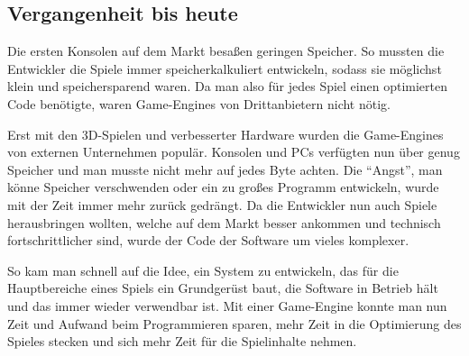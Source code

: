 \subsection{Vergangenheit bis heute}
\label{vergangenheit}
Die ersten Konsolen auf dem Markt besaßen geringen Speicher. So mussten die Entwickler die Spiele immer speicherkalkuliert entwickeln, sodass sie möglichst klein und speichersparend waren. Da man also für jedes Spiel einen optimierten Code benötigte, waren Game-Engines von Drittanbietern nicht nötig.

Erst mit den 3D-Spielen und verbesserter Hardware wurden die Game-Engines von externen Unternehmen populär. Konsolen und PCs verfügten nun über genug Speicher und man musste nicht mehr auf jedes Byte achten. Die "`Angst"', man könne Speicher verschwenden oder ein zu großes Programm entwickeln, wurde mit der Zeit immer mehr zurück gedrängt.
Da die Entwickler nun auch Spiele herausbringen wollten, welche auf dem Markt besser ankommen und technisch fortschrittlicher sind, wurde der Code der Software um vieles komplexer.\todo{!}

So kam man schnell auf die Idee, ein System zu entwickeln, das für die Hauptbereiche eines Spiels ein Grundgerüst baut, die Software in Betrieb hält und das immer wieder verwendbar ist. Mit einer Game-Engine konnte man nun Zeit und Aufwand beim Programmieren sparen, mehr Zeit in die Optimierung des Spieles stecken und sich mehr Zeit für die Spielinhalte nehmen. 
